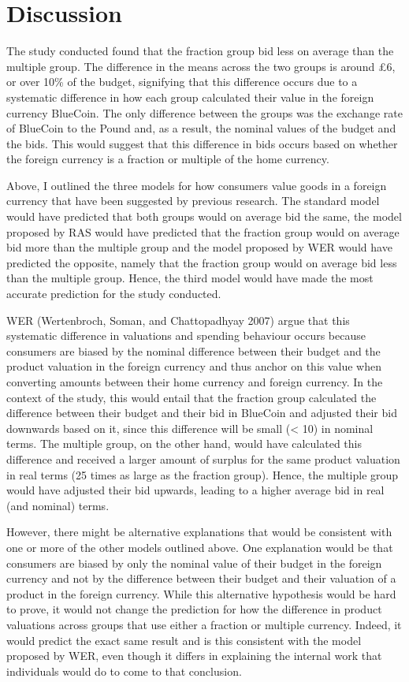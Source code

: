 \documentclass[
]{report}
\begin{document}
\chapter{Discussion}\label{discussion}

The study conducted found that the fraction group bid less on average
than the multiple group. The difference in the means across the two
groups is around £6, or over 10\% of the budget, signifying that this
difference occurs due to a systematic difference in how each group
calculated their value in the foreign currency BlueCoin. The only
difference between the groups was the exchange rate of BlueCoin to the
Pound and, as a result, the nominal values of the budget and the bids.
This would suggest that this difference in bids occurs based on whether
the foreign currency is a fraction or multiple of the home currency.

Above, I outlined the three models for how consumers value goods in a
foreign currency that have been suggested by previous research. The
standard model would have predicted that both groups would on average
bid the same, the model proposed by RAS would have predicted that the
fraction group would on average bid more than the multiple group and the
model proposed by WER would have predicted the opposite, namely that the
fraction group would on average bid less than the multiple group. Hence,
the third model would have made the most accurate prediction for the
study conducted.

WER (Wertenbroch, Soman, and Chattopadhyay 2007) argue that this
systematic difference in valuations and spending behaviour occurs
because consumers are biased by the nominal difference between their
budget and the product valuation in the foreign currency and thus anchor
on this value when converting amounts between their home currency and
foreign currency. In the context of the study, this would entail that
the fraction group calculated the difference between their budget and
their bid in BlueCoin and adjusted their bid downwards based on it,
since this difference will be small (\textless{} 10) in nominal terms.
The multiple group, on the other hand, would have calculated this
difference and received a larger amount of surplus for the same product
valuation in real terms (25 times as large as the fraction group).
Hence, the multiple group would have adjusted their bid upwards, leading
to a higher average bid in real (and nominal) terms.

However, there might be alternative explanations that would be
consistent with one or more of the other models outlined above. One
explanation would be that consumers are biased by only the nominal value
of their budget in the foreign currency and not by the difference
between their budget and their valuation of a product in the foreign
currency. While this alternative hypothesis would be hard to prove, it
would not change the prediction for how the difference in product
valuations across groups that use either a fraction or multiple
currency. Indeed, it would predict the exact same result and is this
consistent with the model proposed by WER, even though it differs in
explaining the internal work that individuals would do to come to that
conclusion.
\end{document}

